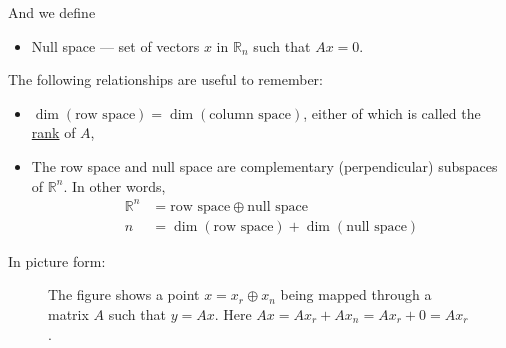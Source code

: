 \begin{enumerate}
    And we define
    \begin{itemize}
        \item Null space --- set of vectors $x$ in $\mathbb{R}_n$ such that $Ax=0$.
    \end{itemize}

    The following relationships are useful to remember:
    \begin{itemize}
        \item $\dim(\text{row space}) = \dim(\text{column space})$, either of which is called the \underline{rank} of $A$,
        \item The row space and null space are complementary (perpendicular) subspaces of $\mathbb{R}^n$. In other words, 
        \begin{align*}
            \mathbb{R}^n &= \text{row space}\oplus\text{null space} \\
            n &= \dim(\text{row space}) + \dim(\text{null space})
        \end{align*}
    \end{itemize}
    In picture form:
    \begin{figure}[H]
        \caption{The figure shows a point $x = x_r \oplus x_n$ being mapped through a matrix $A$ such that $y=Ax$. Here $Ax = Ax_r + Ax_n = Ax_r + 0 = Ax_r$.}
        \label{fig:linear-1}
        \centering
        
    \end{figure}


\end{enumerate}
